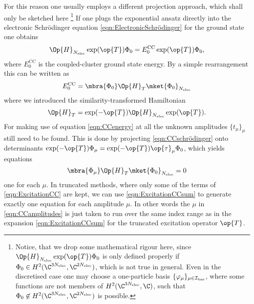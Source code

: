 For this reason one usually employs a different projection approach,
which shall only be sketched here%
\footnote{Notice, that we drop some mathematical rigour here,
	since $\Op{H}_{\Nelec} \exp(\op{T}) \Phi_0$ is only defined properly
	if $\Phi_0 \in H^2(\C^{3\Nelec}, \C^{2\Nelec})$,
	which is not true in general.
	Even in the discretised case one may choose a one-particle basis $\{\varphi_\mu\}_{\mu\in\mathcal{I}_\text{bas}}$,
	where some functions are not members of $H^2(\C^{3\Nelec}, \C)$,
	such that $\Phi_0 \not\in H^2(\C^{3\Nelec}, \C^{2\Nelec})$ is possible.
}
If one plugs the exponential ansatz directly into the electronic Schrödinger equation
\eqref{eqn:ElectronicSchrödinger} for the ground state one obtains
\begin{equation}
	\Op{H}_{\Nelec} \exp(\op{T}) \Phi_0 = E_0^\text{CC} \exp(\op{T}) \Phi_0,
	\label{eqn:CCschrödinger}
\end{equation}
where $E_0^\text{CC}$ is the coupled-cluster ground state energy.
By a simple rearrangement this can be written as
\begin{equation}
	E_0^\text{CC} = \mbra{\Phi_0} \Op{H}_T \mket{\Phi_0}_{\Nelec}
	\label{eqn:CCenergy}
\end{equation}
where we introduced the similarity-transformed Hamiltonian
\[ \Op{H}_T = \exp(-\op{T}) \Op{H}_{\Nelec} \exp(\op{T}). \]
For making use of equation \eqref{eqn:CCenergy}
at all the unknown amplitudes $\{t_\mu\}_{\mu}$ still need to be found.
This is done by projecting \eqref{eqn:CCschrödinger}
onto determinants $\exp(-\op{T}) \Phi_\mu = \exp(-\op{T}) \op{\tau}_\mu \Phi_0$,
which yields equations
\begin{equation}
	\mbra{\Phi_\mu} \Op{H}_T \mket{\Phi_0}_{\Nelec} = 0
	\label{eqn:CCamplitudes}
\end{equation}
one for each $\mu$.
In truncated \CC methods, where only some of the terms of \eqref{eqn:ExcitationCC} are kept,
we can use \eqref{eqn:ExcitationCCsum} to generate exactly one equation
for each amplitude $\mu$.
In other words the $\mu$ in \eqref{eqn:CCamplitudes} is just taken to run over the same
index range as in the expansion \eqref{eqn:ExcitationCCsum} for the truncated
excitation operator $\op{T}$.

